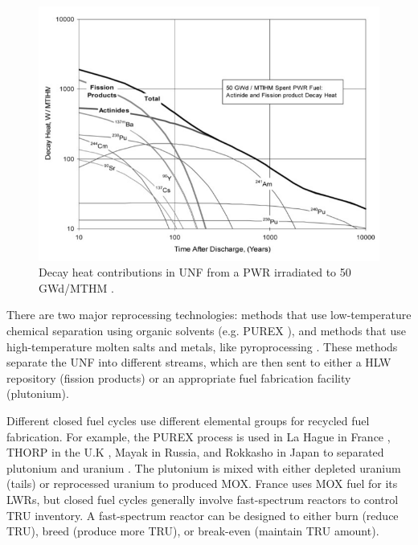 \begin{figure}[htbp!]
	\begin{center}
		\includegraphics[scale=0.5]{./images/decay_heat.png}
	\end{center}
	\caption{Decay heat contributions in \gls{UNF} from a \gls{PWR} irradiated
		to 50 GWd/MTHM \cite{wigeland_separations_2006}.}
	\label{fig:decay_heat}
\end{figure}


There are two major reprocessing technologies:
methods that use low-temperature chemical separation
using organic solvents (e.g. PUREX \cite{baumgaertner_purex_1976}), and
methods that use high-temperature molten salts and metals, like pyroprocessing
\cite{laidler_development_1997}. These methods separate the \gls{UNF}
into different streams, which are then sent to either a \gls{HLW} repository
(fission products) or an appropriate fuel fabrication facility (plutonium).

Different closed fuel cycles use different elemental groups for recycled
fuel fabrication. For example, the PUREX process is used in La Hague in France
\cite{schneider_spent_2008}, THORP in the U.K \cite{riley_technology_1998},
Mayak in Russia, and Rokkasho in Japan to separated plutonium and uranium
\cite{birkett_recent_2005}. The plutonium is mixed with either depleted
uranium (tails) or reprocessed uranium to produced \gls{MOX}. France
uses \gls{MOX} fuel for its \glspl{LWR}, but closed fuel cycles 
generally involve fast-spectrum reactors to control TRU inventory.
A fast-spectrum reactor can be designed to either burn (reduce TRU),
breed (produce more TRU), or break-even (maintain TRU amount).


